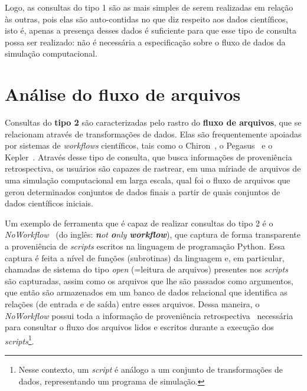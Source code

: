 Logo, as consultas do tipo 1 são as mais simples de serem realizadas em relação às outras, pois elas são auto-contidas no que diz respeito aos dados científicos, isto é, apenas a presença desses dados é suficiente para que esse tipo de consulta possa ser realizado: não é necessária a especificação sobre o fluxo de dados da simulação computacional.

\section{Análise do fluxo de arquivos}%
\label{sec:rastreio-de-fluxos-de-arquivos}

Consultas do \textbf{tipo 2} são caracterizadas pelo rastro do \textbf{fluxo de arquivos}, que se relacionam através de transformações de dados. Elas são frequentemente apoiadas por sistemas de \textit{workflows} científicos, tais como o Chiron~\cite{ogasawara2011algebraic}, o Pegasus~\cite{deelman2005pegasus} e o Kepler~\cite{ludascher2006scientific}. Através desse tipo de consulta, que busca informações de proveniência retrospectiva, os usuários são capazes de rastrear, em uma míriade de arquivos de uma simulação computacional em larga escala, qual foi o fluxo de arquivos que gerou determinados conjuntos de dados finais a partir de quais conjuntos de dados científicos iniciais.

Um exemplo de ferramenta que é capaz de realizar consultas do tipo 2 é o \textit{NoWorkflow}~\cite{murta2014noworkflow} (do inglês: \textit{\textbf{n}ot \textbf{o}nly \textbf{workflow}}), que captura de forma transparente a proveniência de \textit{scripts} escritos na linguagem de programação Python. Essa captura é feita a nível de funções (subrotinas) da linguagem e, em particular, chamadas de sistema do tipo \emph{open} (=leitura de arquivos) presentes nos \textit{scripts} são capturadas, assim como os arquivos que lhe são passados como argumentos, que então são armazenados em um banco de dados relacional que identifica as relações (de entrada e de saída) entre esses arquivos. Dessa maneira, o \textit{NoWorkflow} possui toda a informação de proveniência retrospectiva~\cite{Pimentel2016} necessária para consultar o fluxo dos arquivos lidos e escritos durante a execução dos \textit{scripts}\footnote{Nesse contexto, um \textit{script} é análogo a um conjunto de transformações de dados, representando um programa de simulação.}.

